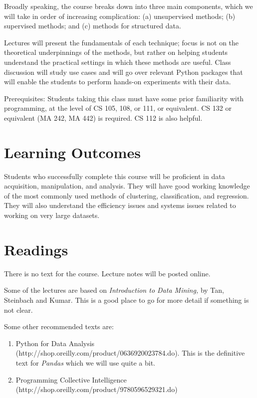 \documentclass[11pt]{article}
\begin{document}
Broadly speaking, the course breaks down into three main components,
which we will take in order of increasing complication:  (a)
unsupervised methods; (b) supervised methods; and (c) methods for
structured data.

Lectures will present the fundamentals of each technique; focus is not
on the theoretical underpinnings of the methods, but rather on helping
students understand the practical settings in which these methods are
useful.  Class discussion will study use cases and will go over relevant
Python packages that will enable the students to perform hands-on
experiments with their data. 

Prerequisites: Students taking this class must have some prior familiarity with
programming, at the level of CS 105, 108, or 111, or equivalent.   CS
132 or equivalent (MA 242, MA 442) is required.  CS 112 is also helpful.

\section*{Learning Outcomes}

Students who successfully complete this course will be proficient in
data acquisition, manipulation, and analysis.   They will have good
working knowledge of the most commonly used methods of clustering,
classification, and regression.   They will also understand the
efficiency issues and systems issues related to working on very large
datasets. 

\section*{Readings} 

There is no text for the course.   Lecture notes will be posted online.

Some of the lectures are based on \emph{Introduction to Data Mining,} by
Tan, Steinbach and Kumar.  This is a good place to go for more detail if
something is not clear.

Some other recommended texts are:
\begin{enumerate}
\item Python for Data Analysis
  (http://shop.oreilly.com/product/0636920023784.do).  This is the
  definitive text for \emph{Pandas} which we will use quite a bit.
\item Programming Collective Intelligence (http://shop.oreilly.com/product/9780596529321.do)
\end{enumerate}
\end{document}
